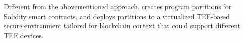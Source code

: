 Different from the abovementioned approach, \tool creates program partitions for Solidity smart contracts, and deploys partitions to a virtualized TEE-based secure environment tailored for blockchain context that could support different TEE devices. 

